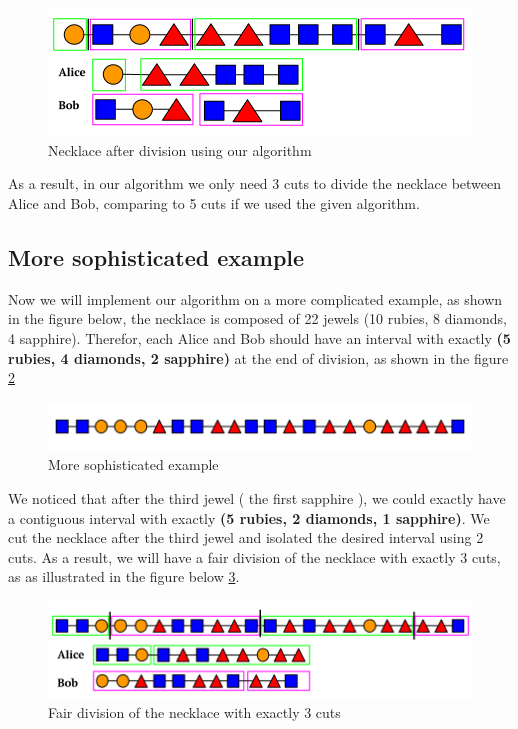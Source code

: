 \documentclass[a4paper,10pt]{article}
\begin{document}
\begin{figure}[H]
  \centering
\includegraphics[scale=.4]{first_step (2).png}
\caption{Necklace after division using our algorithm}
\label{11}
\end{figure}

As a result, in our algorithm we only need 3 cuts to divide the necklace between Alice and Bob, comparing to 5 cuts if we used the given algorithm.

\subsection{More sophisticated example}
Now we will implement our algorithm on a more complicated example, as shown in the figure below, the necklace is composed of 22 jewels (10 rubies, 8 diamonds, 4 sapphire). Therefor, each Alice and Bob should have an interval with exactly \textbf{(5 rubies, 4 diamonds, 2 sapphire)} at the end of division, as shown in the figure \ref{12}

\begin{figure}[H]
  \centering
\includegraphics[scale=.42]{sophistacated.png}
\caption{More sophisticated example}
\label{12}
\end{figure}

We noticed that after the third jewel ( the first sapphire ), we could exactly have a contiguous interval with exactly  \textbf{(5 rubies, 2 diamonds, 1 sapphire)}. We cut the necklace after the third jewel and isolated the desired interval using 2 cuts. As a result, we will have a fair division of the necklace with exactly 3 cuts, as  as illustrated in the figure below \ref{13}.

\begin{figure}[H]
  \centering
\includegraphics[scale=.42]{sophistacated_cuted.png}
\caption{Fair division of the necklace with exactly 3 cuts}
\label{13}
\end{figure}
\end{document}

